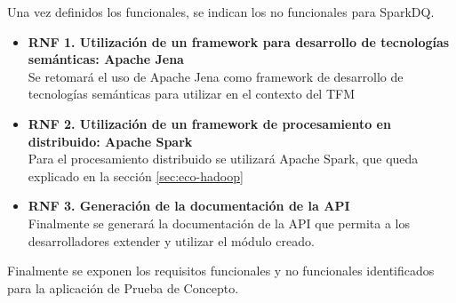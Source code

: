 Una vez definidos los funcionales, se indican los no funcionales para SparkDQ.

\begin{itemize}
\item \textbf{RNF 1. Utilización de un framework para desarrollo de tecnologías
  semánticas: Apache Jena}\\Se retomará el uso de Apache Jena como framework de
  desarrollo de tecnologías semánticas para utilizar en el contexto del \acs{TFM}
\item \textbf{RNF 2. Utilización de un framework de procesamiento en
  distribuido: Apache Spark}\\Para el procesamiento distribuido se utilizará
  Apache Spark, que queda explicado en la sección \ref{sec:eco-hadoop}
\item \textbf{RNF 3. Generación de la documentación de la \acs{API}}\\Finalmente
  se generará la documentación de la API que permita a los desarrolladores
  extender y utilizar el módulo creado. 
\end{itemize}

Finalmente se exponen los requisitos funcionales y no funcionales identificados para la
aplicación de Prueba de Concepto.

